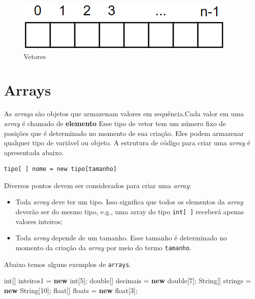 \documentclass[
]{book}
\newenvironment{Shaded}{\begin{snugshade}}{\end{snugshade}}
\newcommand{\BuiltInTok}[1]{#1}
\newcommand{\DataTypeTok}[1]{\textcolor[rgb]{0.13,0.29,0.53}{#1}}
\newcommand{\DecValTok}[1]{\textcolor[rgb]{0.00,0.00,0.81}{#1}}
\newcommand{\KeywordTok}[1]{\textcolor[rgb]{0.13,0.29,0.53}{\textbf{#1}}}
\newcommand{\NormalTok}[1]{#1}
\providecommand{\tightlist}{%
  \setlength{\itemsep}{0pt}\setlength{\parskip}{0pt}}
\begin{document}
\begin{figure}
\centering
\includegraphics{imagens/vetores.png}
\caption{Vetores}
\end{figure}

\hypertarget{arrays}{%
\section{Arrays}\label{arrays}}

As \emph{arrays} são objetos que armazenam valores em sequência.Cada valor em uma \emph{array} é chamado de \textbf{elemento} Esse tipo de vetor tem um número fixo de posições que é determinado no momento de sua criação. Eles podem armazenar qualquer tipo de variável ou objeto. A estrutura de código para criar uma \emph{array} é apresentada abaixo.

\begin{verbatim}
tipo[ ] nome = new tipo[tamanho]
\end{verbatim}

Diversos pontos devem ser considerados para criar uma \emph{array}:

\begin{itemize}
\tightlist
\item
  Toda \emph{array} deve ter um tipo. Isso significa que todos os elementos da \emph{array} deverão ser do mesmo tipo, e.g., uma array do tipo \texttt{int{[}\ {]}} receberá apenas valores inteiros;
\item
  Toda \emph{array} depende de um tamanho. Esse tamanho é determinado no momento da criação da \emph{array} por meio do termo \texttt{tamanho}.
\end{itemize}

Abaixo temos alguns exemplos de \texttt{arrays}.

\begin{Shaded}
\begin{Highlighting}[]
\DataTypeTok{int}\NormalTok{[] inteiros1 = }\KeywordTok{new} \DataTypeTok{int}\NormalTok{[}\DecValTok{5}\NormalTok{];}
\DataTypeTok{double}\NormalTok{[] decimais = }\KeywordTok{new}  \DataTypeTok{double}\NormalTok{[}\DecValTok{7}\NormalTok{];}
\BuiltInTok{String}\NormalTok{[] strings = }\KeywordTok{new} \BuiltInTok{String}\NormalTok{[}\DecValTok{10}\NormalTok{];}
\DataTypeTok{float}\NormalTok{[] floats = }\KeywordTok{new} \DataTypeTok{float}\NormalTok{[}\DecValTok{3}\NormalTok{];}
\end{Highlighting}
\end{Shaded}
\end{document}
